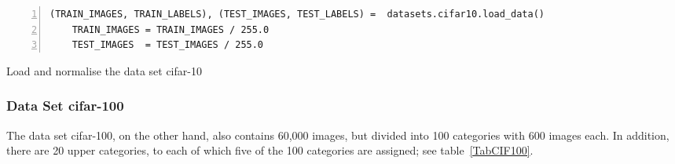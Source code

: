 \begin{code}
\begin{lstlisting}[language=MyPython, numbers=left,label={src:cifarimport}]
	(TRAIN_IMAGES, TRAIN_LABELS), (TEST_IMAGES, TEST_LABELS) =  datasets.cifar10.load_data()
	TRAIN_IMAGES = TRAIN_IMAGES / 255.0
	TEST_IMAGES  = TEST_IMAGES / 255.0
\end{lstlisting}
  \caption{Load and normalise the data set \ac{cifar}-10}
\end{code}


\subsubsection{Data Set \ac{cifar}-100}\label{sec:dataset}


The data set \ac{cifar}-100, on the other hand, also contains 60,000 images, but divided into 100 categories with 600 images each. In addition, there are 20 upper categories, to each of which five of the 100 categories are assigned; see table~\ref{TabCIF100}.

